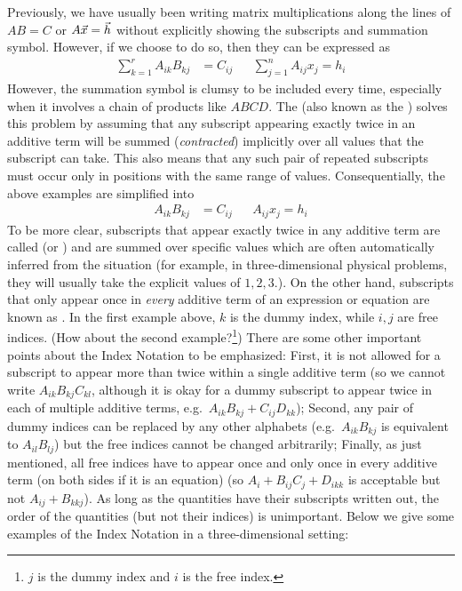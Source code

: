 Previously, we have usually been writing matrix multiplications along the lines of $AB = C$ or $A\vec{x} = \smash{\vec{h}}$ without explicitly showing the subscripts and summation symbol. However, if we choose to do so, then they can be expressed as
\begin{align*}
\sum_{k=1}^r A_{ik}B_{kj} &= C_{ij} &  & \sum_{j=1}^n A_{ij}x_j = h_i
\end{align*}
However, the summation symbol is clumsy to be included every time, especially when it involves a chain of products like $ABCD$. The  (also known as the ) solves this problem by assuming that any subscript appearing exactly twice in an additive term will be summed (\textit{contracted}) implicitly over all values that the subscript can take. This also means that any such pair of repeated subscripts must occur only in positions with the same range of values. Consequentially, the above examples are simplified into
\begin{align*}
A_{ik}B_{kj} &= C_{ij} &  & A_{ij}x_j = h_i    
\end{align*}
To be more clear, subscripts that appear exactly twice in any additive term are called  (or ) and are summed over specific values which are often automatically inferred from the situation (for example, in three-dimensional physical problems, they will usually take the explicit values of $1,2,3$.). On the other hand, subscripts that only appear once in \textit{every} additive term of an expression or equation are known as . In the first example above, $k$ is the dummy index, while $i, j$ are free indices. (How about the second example?\footnote{$j$ is the dummy index and $i$ is the free index.}) There are some other important points about the Index Notation to be emphasized: First, it is not allowed for a subscript to appear more than twice within a single additive term (so we cannot write $A_{ik}B_{kj}C_{kl}$, although it is okay for a dummy subscript to appear twice in each of multiple additive terms, e.g.\ $A_{ik}B_{kj} + C_{ij}D_{kk}$); Second, any pair of dummy indices can be replaced by any other alphabets (e.g.\ $A_{ik}B_{kj}$ is equivalent to $A_{il}B_{lj}$) but the free indices cannot be changed arbitrarily; Finally, as just mentioned, all free indices have to appear once and only once in every additive term (on both sides if it is an equation) (so $A_i + B_{ij}C_{j} + D_{ikk}$ is acceptable but not $A_{ij} + B_{kkj}$). As long as the quantities have their subscripts written out, the order of the quantities (but not their indices) is unimportant. Below we give some examples of the Index Notation in a three-dimensional setting:

